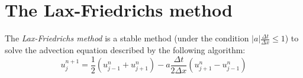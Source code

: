 \documentclass[11pt,a4paper]{article}
\begin{document}
\section{The Lax-Friedrichs method}
The \emph{Lax-Friedrichs method} is a stable method (under the condition $|a|\frac{\Delta t}{\Delta x} \leq 1$) to solve the advection equation described by the following algorithm:
\begin{equation}
u_j^{n+1} = \frac{1}{2} (u_{j-1}^n + u_{j+1}^n) - a\frac{\Delta t}{2\Delta x}(u_{j+1}^n - u_{j-1}^n)
\end{equation}
\begin{figure}[!h]
\centering
{}

\end{figure}
\end{document}
